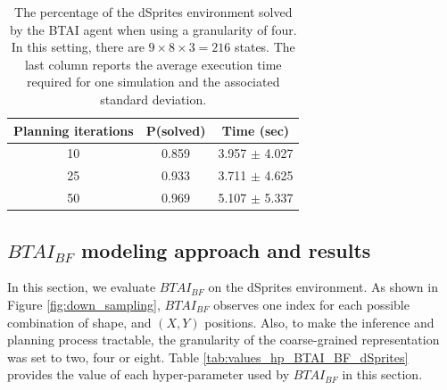 \documentclass[twoside,11pt]{article}
\begin{document}
\begin{table}[H]
\centering
\begin{tabular}{ |c|c|c| }
 \hline
 Planning iterations & P(solved) & Time (sec) \\
 \hline
 10 & 0.859 & 3.957 $\pm$ 4.027 \\
 \hline
 25 & 0.933 & 3.711 $\pm$ 4.625 \\
 \hline
 50 & 0.969 & 5.107 $\pm$ 5.337 \\
 \hline
\end{tabular}
\caption{The percentage of the dSprites environment solved by the BTAI agent when using a granularity of four. In this setting, there are $9 \times 8 \times 3 = 216$ states. The last column reports the average execution time required for one simulation and the associated standard deviation.}
\label{tab:dSprites_res_4}
\end{table}

\subsection{$BTAI_{BF}$ modeling approach and results} \label{ssec:btai_bf}

In this section, we evaluate $BTAI_{BF}$ \citep{BTAI_BF} on the dSprites environment. As shown in Figure \ref{fig:down_sampling}, $BTAI_{BF}$ observes one index for each possible combination of shape, and $(X, Y)$ positions. Also, to make the inference and planning process tractable, the granularity of the coarse-grained representation was set to two, four or eight. Table \ref{tab:values_hp_BTAI_BF_dSprites} provides the value of each hyper-parameter used by $BTAI_{BF}$ in this section.
\end{document}
